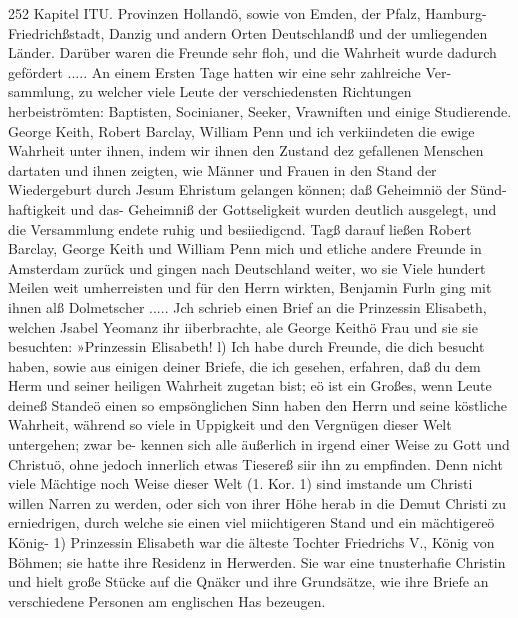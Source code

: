 252 Kapitel ITU.
Provinzen Hollandö, sowie von Emden, der Pfalz, Hamburg-
Friedrichßstadt, Danzig und andern Orten Deutschlandß und der
umliegenden Länder. Darüber waren die Freunde sehr floh, und
die Wahrheit wurde dadurch gefördert .....
An einem Ersten Tage hatten wir eine sehr zahlreiche Ver-
sammlung, zu welcher viele Leute der verschiedensten Richtungen
herbeiströmten: Baptisten, Socinianer, Seeker, Vrawniften und
einige Studierende. George Keith, Robert Barclay, William Penn
und ich verkiindeten die ewige Wahrheit unter ihnen, indem wir
ihnen den Zustand dez gefallenen Menschen dartaten und ihnen
zeigten, wie Männer und Frauen in den Stand der Wiedergeburt
durch Jesum Ehristum gelangen können; daß Geheimniö der Sünd-
haftigkeit und das- Geheimniß der Gottseligkeit wurden deutlich
ausgelegt, und die Versammlung endete ruhig und besiiedigcnd.
Tagß darauf ließen Robert Barclay, George Keith und William
Penn mich und etliche andere Freunde in Amsterdam zurück und
gingen nach Deutschland weiter, wo sie Viele hundert Meilen weit
umherreisten und für den Herrn wirkten, Benjamin Furln ging mit
ihnen alß Dolmetscher .....
Jch schrieb einen Brief an die Prinzessin Elisabeth, welchen
Jsabel Yeomanz ihr iiberbrachte, ale George Keithö Frau und
sie sie besuchten:
»Prinzessin Elisabeth! l)
Ich habe durch Freunde, die dich besucht haben, sowie aus
einigen deiner Briefe, die ich gesehen, erfahren, daß du dem Herm
und seiner heiligen Wahrheit zugetan bist; eö ist ein Großes,
wenn Leute deineß Standeö einen so empsönglichen Sinn haben
  den Herrn und seine köstliche Wahrheit, während so viele in
Uppigkeit und den Vergnügen dieser Welt untergehen; zwar be-
kennen sich alle äußerlich in irgend einer Weise zu Gott und
Christuö, ohne jedoch innerlich etwas Tiesereß siir ihn zu empfinden.
Denn nicht viele Mächtige noch Weise dieser Welt (1. Kor. 1)
sind imstande um Christi willen Narren zu werden, oder sich von
ihrer Höhe herab in die Demut Christi zu erniedrigen, durch
welche sie einen viel miichtigeren Stand und ein mächtigereö König-
1) Prinzessin Elisabeth war die älteste Tochter Friedrichs V., König von
Böhmen; sie hatte ihre Residenz in Herwerden. Sie war eine tnusterhafie
Christin und hielt große Stücke auf die Qnäkcr und ihre Grundsätze, wie ihre
Briefe an verschiedene Personen am englischen Has bezeugen.


